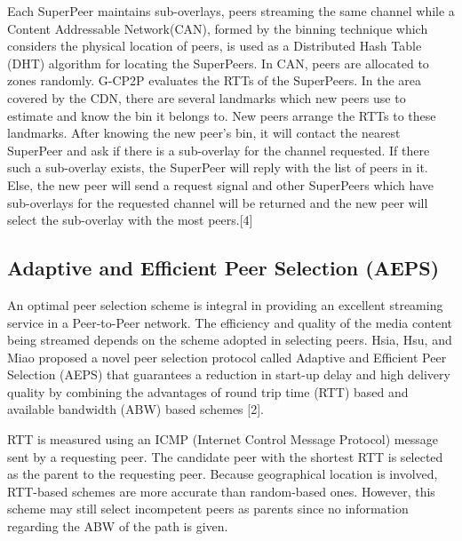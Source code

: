 \documentclass[letterpaper, twocolumn, twoside]{IEEEtran}
\begin{document}
Each SuperPeer maintains sub-overlays, peers streaming the same channel while a Content Addressable Network(CAN), formed by the binning technique which considers the physical location of peers, is used as a Distributed Hash Table (DHT) algorithm for locating the SuperPeers. In CAN, peers are allocated to zones randomly. G-CP2P evaluates the RTTs of the SuperPeers. In the area covered by the CDN, there are several landmarks which new peers use to estimate and know the bin it belongs to. New peers arrange the RTTs to these landmarks. After knowing the new peer's bin, it will contact the nearest SuperPeer and ask if there is a sub-overlay for the channel requested. If there such a sub-overlay exists, the SuperPeer will reply with the list of peers in it. Else, the new peer will send a request signal and other SuperPeers which have sub-overlays for the requested channel will be returned and the new peer will select the sub-overlay with the most peers.[4]
\subsection{Adaptive and Efficient Peer Selection (AEPS)}
An optimal peer selection scheme is integral in providing an excellent streaming service in a Peer-to-Peer network. The efficiency and quality of the media content being streamed depends on the scheme adopted in selecting peers. Hsia, Hsu, and Miao proposed a novel peer selection protocol called Adaptive and Efficient Peer Selection (AEPS) that guarantees a reduction in start-up delay and high delivery quality by combining the advantages of round trip time (RTT) based and available bandwidth (ABW) based schemes [2].

RTT is measured using an ICMP (Internet Control Message Protocol) message sent by a requesting peer. The candidate peer with the shortest RTT is selected as the parent to the requesting peer. Because geographical location is involved, RTT-based schemes are more accurate than random-based ones. However, this scheme may still select incompetent peers as parents since no information regarding the ABW of the path is given.
\end{document}
